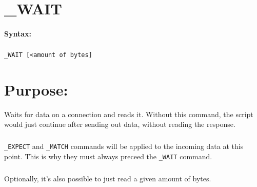 
\newpage
\section{\_WAIT}
\label{cmd:_WAIT}

\paragraph{Syntax:}
\subparagraph{}
\texttt{\_WAIT [<amount of bytes]}

\section{Purpose:}
Waits for data on a connection and reads it. Without this 
command, the script would just continue after sending out 
data, without reading the response.

\subparagraph{}
\texttt{\_EXPECT} and \texttt{\_MATCH} commands will be 
applied to the incoming data at this point. This is why 
they must always preceed the \texttt{\_WAIT} command. 

\subparagraph{}
Optionally, it's also possible to just read a given amount 
of bytes.